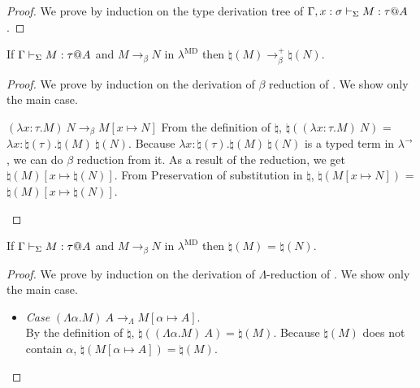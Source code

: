 \begin{proof}
    We prove by induction on the type derivation tree of $\G, x:\sigma \V M:\tau@A$.
\end{proof}

\begin{lemma}
    \label{lemma:PreservationOfBetaReductionInNatural}
    If $\G \V M:\tau@A$ and $M \longrightarrow_\beta N$ in $\lambda^{\text{MD}}$
    then $\natural(M) \longrightarrow_\beta^+ \natural(N)$.
\end{lemma}

\begin{proof}
    {
        We prove by induction on the derivation of $\beta$ reduction of \LMD.
        We show only the main case.
        \newcommand{\R}{\longrightarrow_{\beta}}
        \begin{rneqncase}{$(\lambda x:\tau.M)\ N \R M[x \mapsto N]$}{}
            From the definition of $\natural$,
            $\natural((\lambda x:\tau.M)\ N)$ = $\lambda x:\natural(\tau).\natural(M)\ \natural(N)$.
            Because $\lambda x:\natural(\tau).\natural(M)\ \natural(N)$ is a typed term in $\lambda^\to$,
            we can do $\beta$ reduction from it.
            As a result of the reduction, we get $\natural(M)[x\mapsto\natural(N)]$.
            From Preservation of substitution in $\natural$, $\natural(M[x \mapsto N])$ = $\natural(M)[x\mapsto\natural(N)]$.
        \end{rneqncase}
    }
\end{proof}

\begin{lemma}
    \label{lemma:PreservationOfLambdaReductionInNatural}
    If $\G \V M:\tau@A$ and $M \longrightarrow_\beta N$ in $\lambda^{\text{MD}}$
    then $\natural(M)$ =  $\natural(N)$.
\end{lemma}

\begin{proof}
    We prove by induction on the derivation of $\Lambda$-reduction of \LMD.
    We show only the main case.
    \begin{itemize}
        \item \textit{Case} \( (\Lambda\alpha.M)\ A \longrightarrow_\Lambda M[\alpha\mapsto A] \).\\
            By the definition of $\natural$, \(\natural((\Lambda\alpha.M)\ A) = \natural(M)\).
            Because \(\natural(M)\) does not contain \(\alpha\), \(\natural(M[\alpha\mapsto A]) = \natural(M)\).
    \end{itemize}

\end{proof}

